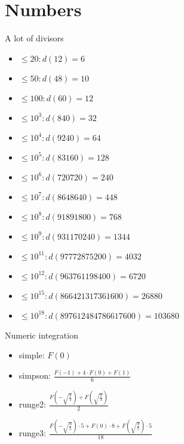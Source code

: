 \section{Numbers}

A lot of divisors
\begin{itemize}
	\item $\leq 20: d(12)=6$
	\item $\leq 50: d(48)=10$
	\item $\leq 100: d(60)=12$
	\item $\leq 10^3: d(840)=32$
	\item $\leq 10^4: d(9240)=64$
	\item $\leq 10^5: d(83160)=128$
	\item $\leq 10^6: d(720720)=240$
	\item $\leq 10^7: d(8648640)=448$
	\item $\leq 10^8: d(91891800)=768$
	\item $\leq 10^9: d(931170240)=1344$
	\item $\leq 10^{11}: d(97772875200)=4032$
	\item $\leq 10^{12}: d(963761198400)=6720$
	\item $\leq 10^{15}: d(866421317361600)=26880$
	\item $\leq 10^{18}: d(897612484786617600)=103680$
\end{itemize}

Numeric integration
\begin{itemize}
	\item simple: $F(0)$
	\item simpson: $\frac{F(-1) + 4 \cdot F(0) + F(1)}{6}$
	\item runge2: $\frac{ F(-\sqrt{\frac{1}{3}}) + F(\sqrt{\frac{1}{3}}) }{2}$
	\item runge3: $\frac{ F(-\sqrt{\frac{3}{5}}) \cdot 5 + F(0) \cdot 8 +  F(\sqrt{\frac{3}{5}}) \cdot 5}{18}$
\end{itemize}
